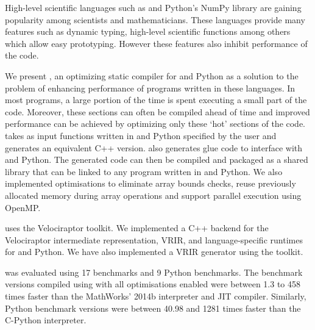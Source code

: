 High-level scientific languages such as \matlab and Python's NumPy 
library are gaining popularity among scientists and 
mathematicians. These languages provide many features such as dynamic typing, 
high-level scientific functions among others which allow easy 
prototyping. However these features also inhibit performance of the code. 

We present \velocty, an optimizing static compiler for \matlab and Python as a 
solution to the problem of enhancing performance of programs written in these 
languages. In most programs, a large portion of the time is spent executing a 
small part of the code. Moreover, these sections can often be compiled ahead of 
time and improved performance can be achieved by optimizing only these `hot' 
sections of the code. \velocty takes as input functions written in \matlab and 
Python specified by the user and generates an equivalent C++ version. \velocty also generates glue code to interface with \matlab and Python. The generated code can then be compiled and packaged as 
a shared library that can be linked to any program written in \matlab and 
Python. We also implemented optimisations to eliminate array bounds checks, 
reuse previously allocated memory during array operations and support parallel execution using OpenMP. 

\velocty uses the Velociraptor toolkit. We implemented a C++ backend for the 
Velociraptor intermediate representation, VRIR, and language-specific runtimes 
for \matlab and Python. We have also implemented a \matlab VRIR generator using the \mclab toolkit. 

\velocty was evaluated using 17 \matlab benchmarks and 9 Python benchmarks. The \matlab benchmark versions 
compiled using \velocty with all optimisations enabled were between 1.3 to 458 times faster than the MathWorks' 
\matlab2014b interpreter and JIT compiler. Similarly, Python benchmark versions were between 40.98 and 1281 times faster than the C-Python interpreter.